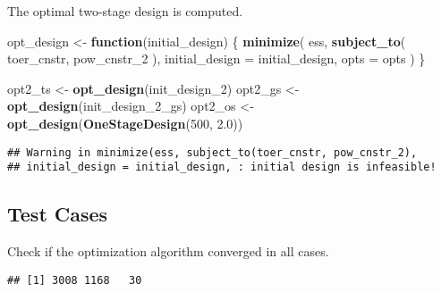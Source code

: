 \documentclass[]{book}
\newenvironment{Shaded}{\begin{snugshade}}{\end{snugshade}}
\newcommand{\ControlFlowTok}[1]{\textcolor[rgb]{0.13,0.29,0.53}{\textbf{#1}}}
\newcommand{\DataTypeTok}[1]{\textcolor[rgb]{0.13,0.29,0.53}{#1}}
\newcommand{\DecValTok}[1]{\textcolor[rgb]{0.00,0.00,0.81}{#1}}
\newcommand{\FloatTok}[1]{\textcolor[rgb]{0.00,0.00,0.81}{#1}}
\newcommand{\KeywordTok}[1]{\textcolor[rgb]{0.13,0.29,0.53}{\textbf{#1}}}
\newcommand{\NormalTok}[1]{#1}
\newcommand{\OperatorTok}[1]{\textcolor[rgb]{0.81,0.36,0.00}{\textbf{#1}}}
\newcommand{\StringTok}[1]{\textcolor[rgb]{0.31,0.60,0.02}{#1}}
\begin{document}
The optimal two-stage design is computed.

\begin{Shaded}
\begin{Highlighting}[]
\NormalTok{opt_design <-}\StringTok{ }\ControlFlowTok{function}\NormalTok{(initial_design) \{}
    \KeywordTok{minimize}\NormalTok{(}
\NormalTok{        ess,}
        \KeywordTok{subject_to}\NormalTok{(}
\NormalTok{            toer_cnstr,}
\NormalTok{            pow_cnstr_}\DecValTok{2}
\NormalTok{        ),}
        \DataTypeTok{initial_design =}\NormalTok{ initial_design,}
        \DataTypeTok{opts =}\NormalTok{ opts}
\NormalTok{    )}
\NormalTok{\}}

\NormalTok{opt2_ts <-}\StringTok{ }\KeywordTok{opt_design}\NormalTok{(init_design_}\DecValTok{2}\NormalTok{)}
\NormalTok{opt2_gs <-}\StringTok{ }\KeywordTok{opt_design}\NormalTok{(init_design_}\DecValTok{2}\NormalTok{_gs)}
\NormalTok{opt2_os <-}\StringTok{ }\KeywordTok{opt_design}\NormalTok{(}\KeywordTok{OneStageDesign}\NormalTok{(}\DecValTok{500}\NormalTok{, }\FloatTok{2.0}\NormalTok{))}
\end{Highlighting}
\end{Shaded}

\begin{verbatim}
## Warning in minimize(ess, subject_to(toer_cnstr, pow_cnstr_2),
## initial_design = initial_design, : initial design is infeasible!
\end{verbatim}

\hypertarget{test-cases-8}{%
\subsection{Test Cases}\label{test-cases-8}}

Check if the optimization algorithm converged in all cases.

\begin{Shaded}
\end{Shaded}

\begin{verbatim}
## [1] 3008 1168   30
\end{verbatim}
\end{document}
